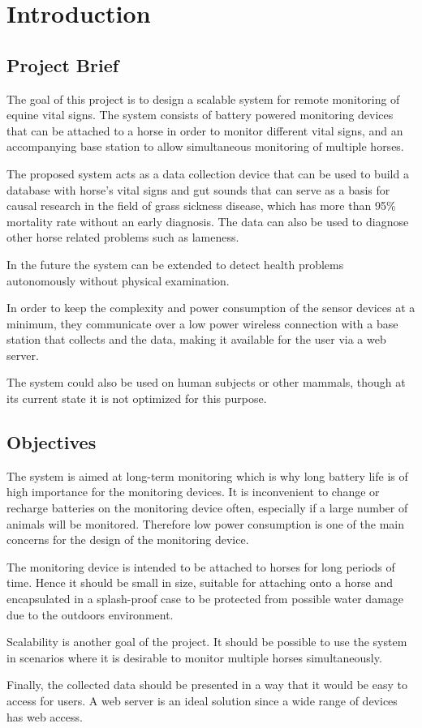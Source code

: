 \chapter{Introduction}


\section{Project Brief}
The goal of this project is to design a scalable system for remote monitoring of equine vital signs. The system consists of battery powered monitoring devices that can be attached to a horse in order to monitor different vital signs, and an accompanying base station to allow simultaneous monitoring of multiple horses. 

The proposed system acts as a data collection device that can be used to build a database with horse's vital signs and gut sounds that can serve as a basis for causal research in the field of grass sickness disease, which has more than 95\% mortality rate without an early diagnosis\cite{robinson2009current}. The data can also be used to diagnose other horse related problems such as lameness.

In the future the system can be extended to detect health problems autonomously without physical examination.

In order to keep the complexity and power consumption of the sensor devices at a minimum, they communicate over a low power wireless connection with a base station that collects and the data, making it available for the user via a web server.

The system could also be used on human subjects or other mammals, though at its current state it is not optimized for this purpose.


\section{Objectives}
The system is aimed at long-term monitoring which is why long battery life is of high importance for the monitoring devices. It is inconvenient to change or recharge batteries on the monitoring device often, especially if a large number of animals will be monitored. Therefore low power consumption is one of the main concerns for the design of the monitoring device.

The monitoring device is intended to be attached to horses for long periods of time. Hence it should be small in size, suitable for attaching onto a horse and encapsulated in a splash-proof case to be protected from possible water damage due to the outdoors environment.

Scalability is another goal of the project. It should be possible to use the system in scenarios where it is desirable to monitor multiple horses simultaneously. 

Finally, the collected data should be presented in a way that it would be easy to access for users. A web server is an ideal solution since a wide range of devices has web access.   